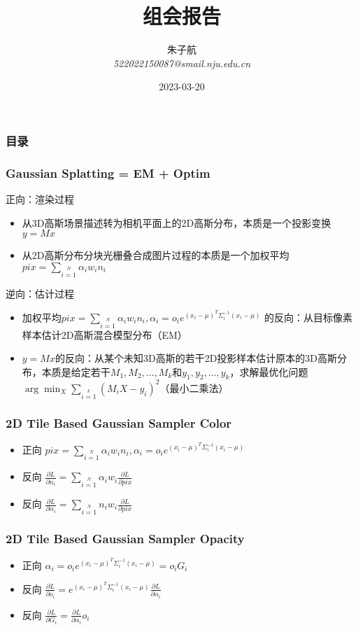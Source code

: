 \documentclass{njupre/njupre}
\title[组会报告]{ 组会报告 }
\author[朱子航]{\texorpdfstring{朱子航 \\ \smallskip \textit{522022150087@smail.nju.edu.cn}}{}}
\date[\today]{\texorpdfstring{2023-03-20}{}}
\begin{document}
\begin{frame}
    \titlepage
\end{frame}
\begin{frame}
    \frametitle{目录}
    \tableofcontents
\end{frame}

\begin{frame}
    \frametitle{Gaussian Splatting = EM + Optim}
    正向：渲染过程
    \begin{itemize}
        \item 从3D高斯场景描述转为相机平面上的2D高斯分布，本质是一个投影变换$y=Mx$
        \item 从2D高斯分布分块光栅叠合成图片过程的本质是一个加权平均$pix=\sum\limits_{i=1}\limits^{N} \alpha_i w_in_i$
    \end{itemize}  
    逆向：估计过程
    \begin{itemize}
        \item 加权平均$pix=\sum\limits_{i=1}\limits^{N} \alpha_i w_in_i, \alpha_i=o_i e^{(x_i-\mu)^T\Sigma_i^{-1}(x_i-\mu)}$ 的反向：从目标像素样本估计2D高斯混合模型分布（EM）
        \item $y=Mx$的反向：从某个未知3D高斯的若干2D投影样本估计原本的3D高斯分布，本质是给定若干$M_1,M_2,\dots,M_k$和$y_1,y_2,\dots,y_k$，求解最优化问题$\arg\min_X \sum\limits_{i=1}\limits^{k} (M_iX-y_i)^2$（最小二乘法）
    \end{itemize}   
\end{frame}

\begin{frame}
    \frametitle{2D Tile Based Gaussian Sampler Color}
    

    \begin{itemize}
        \item 正向 $pix=\sum\limits_{i=1}\limits^{N} \alpha_i w_in_i, \alpha_i=o_i e^{(x_i-\mu)^T\Sigma_i^{-1}(x_i-\mu)}$ 
        \item 反向 $\frac{\partial L }{\partial n_i } = \sum\limits_{i=1}\limits^{N} \alpha_iw_i \frac{\partial L }{\partial pix}$
        \item 反向 $\frac{\partial L }{\partial \alpha_i } = \sum\limits_{i=1}\limits^{N} n_iw_i \frac{\partial L }{\partial pix}$
    \end{itemize}
\end{frame}

\begin{frame}
    \frametitle{2D Tile Based Gaussian Sampler Opacity}
    
    \begin{itemize}
        \item 正向 $\alpha_i=o_i e^{(x_i-\mu)^T\Sigma_i^{-1}(x_i-\mu)} = o_iG_i$ 
        \item 反向 $\frac{\partial L }{\partial o_i } = e^{(x_i-\mu)^T\Sigma_i^{-1}(x_i-\mu)} \frac{\partial L }{\partial \alpha_i} $
        \item 反向 $\frac{\partial L }{\partial G_i } = \frac{\partial L }{\partial \alpha_i}o_i$
    \end{itemize}
\end{frame}
\end{document}
